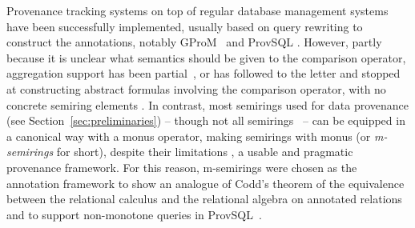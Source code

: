 Provenance tracking systems on top of regular database management systems
have been successfully implemented, usually based on query rewriting to construct the
annotations, notably GProM~\cite{arab2018gprom} and ProvSQL
\cite{senellart2018provsql,sen2026provsql}. However, partly because it
is unclear what semantics should be given to the comparison operator,
aggregation support has been partial~\cite{arab2018gprom},
or has followed \cite{amsterdamer2011provenance} to
the letter and stopped at constructing abstract formulas involving the
comparison operator, with no concrete semiring elements
\cite{sen2026provsql,pintor2025dbms}.
In contrast, most semirings used for data provenance (see
Section~\ref{sec:preliminaries}) -- though not all
semirings~\cite{amarilli2016example} -- can be equipped in a canonical way
with a monus operator, making semirings with monus (or \emph{m-semirings}
for short), despite their limitations \cite{amsterdamer2011limitations},
a usable and pragmatic provenance framework. For this reason, m-semirings were chosen
as the annotation framework
to show an analogue of Codd's theorem of the equivalence between the relational
calculus and the relational algebra on annotated relations
\cite{badia2025codd} and to support non-monotone queries in
ProvSQL~\cite{sen2026provsql}.

